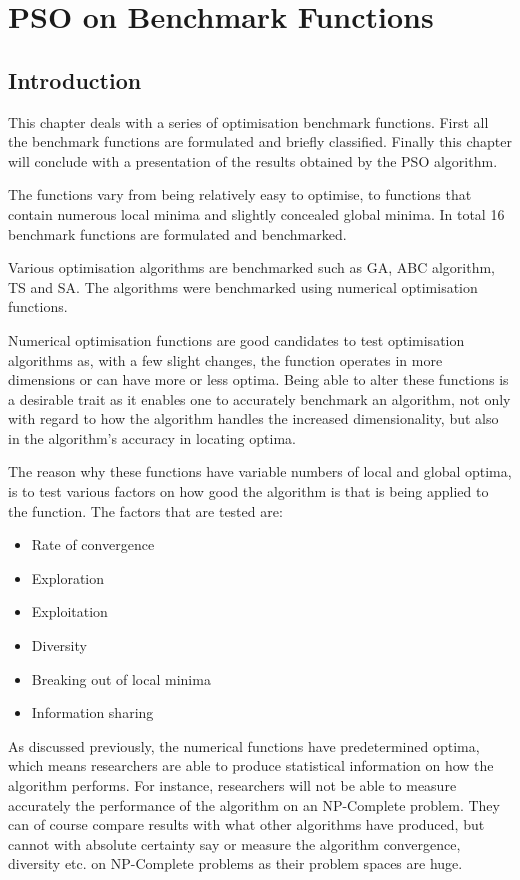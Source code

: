 \chapter{PSO on Benchmark Functions}
\label{chpt:benchmark}
\section{Introduction}
This chapter deals with a series of optimisation benchmark functions. First all the benchmark functions are formulated and briefly classified. Finally this chapter will conclude with a presentation of the results obtained by the PSO algorithm.

The functions vary from being relatively easy to optimise, to functions that contain numerous local minima and slightly concealed global minima. In total 16 benchmark functions are formulated and benchmarked.

Various optimisation algorithms are benchmarked such as GA, ABC algorithm, TS and SA\cite{devparallelgasa,CompuIntelligenceIntro,FundamentalSwarm}. The algorithms were benchmarked using numerical optimisation functions.

Numerical optimisation functions are good candidates to test optimisation algorithms as, with a few slight changes, the function operates in more dimensions or can have more or less optima\cite{devparallelgasa,CompuIntelligenceIntro,FundamentalSwarm}. Being able to alter these functions is a desirable trait as it enables one to accurately benchmark an algorithm, not only with regard to how the algorithm handles the increased dimensionality, but also in the algorithm's accuracy in locating optima\cite{devparallelgasa,CompuIntelligenceIntro,FundamentalSwarm}.

The reason why these functions have variable numbers of local and global optima, is to test various factors on how good the algorithm is that is being applied to the function. The factors that are tested are\cite{CompuIntelligenceIntro,FundamentalSwarm}:
\begin{itemize}
\item Rate of convergence
\item Exploration
\item Exploitation
\item Diversity
\item Breaking out of local minima
\item Information sharing
\end{itemize}

As discussed previously, the numerical functions have predetermined optima, which means researchers are able to produce statistical information on how the algorithm performs. For instance, researchers will not be able to measure accurately the performance of the algorithm on an NP-Complete problem\cite{CompuIntelligenceIntro,FundamentalSwarm}. They can of course compare results with what other algorithms have produced, but cannot with absolute certainty say or measure the algorithm convergence, diversity etc. on NP-Complete problems as their problem spaces are huge\cite{evalevoalgo}. 

